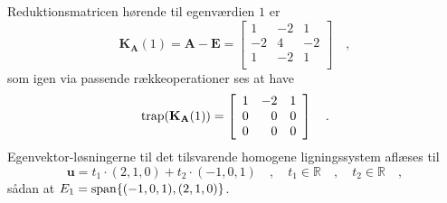 \begin{example}
Reduktionsmatricen hørende til egenværdien $1$ er
\begin{equation}
\mathbf{K}_{\mathbf{A}}(1) = \mathbf{A} - \mathbf{E} = \left[
                                          \begin{array}{rrr}
                                            1 &  -2 & 1 \\
                                            -2 & 4 & -2 \\
                                            1 & -2& 1 \\
                                          \end{array}
                                        \right] \quad ,
\end{equation}
som igen via passende rækkeoperationer ses at have
\begin{equation}
\mathrm{trap}(\mathbf{K}_{\mathbf{A}}(1)) = \left[
                                          \begin{array}{rrr}
                                            1 &  -2 & 1 \\
                                            0 & 0 & 0 \\
                                            0 & 0& 0 \\
                                          \end{array}
                                        \right] \quad .
\end{equation}
Egenvektor-løsningerne til det tilsvarende homogene ligningssystem aflæses til
\begin{equation}
\mathbf{u} = t_{1} \cdot (2,1,0) + t_{2} \cdot (-1,0, 1) \quad , \quad t_{1} \in \mathbb{R} \quad , \quad t_{2} \in \mathbb{R} \quad ,
\end{equation}
sådan at $E_{1}= \mathrm{span}\{(-1,0,1), (2,1,0) \}$. \\


\end{example}
